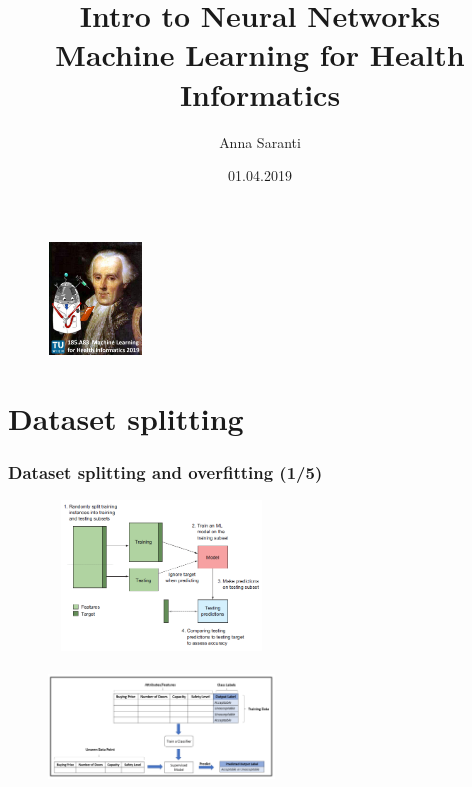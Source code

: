 \documentclass{beamer}
\title[Intro to Neural Networks]{Intro to Neural Networks\\Machine Learning for Health Informatics}
\author{Anna Saranti}
\institute{Holzinger Group hci-kdd.org}
\date{01.04.2019}
\begin{document}
\begin{frame}
  \titlepage
  
  \begin{figure}[ht]
	\centering
    \includegraphics[width=2.5cm, height=3cm]{figures/HddKciLogo}
	\label{fig:HddKciLogo}
  \end{figure}
  
\end{frame}

\section{Dataset splitting} 
\begin{frame}
\frametitle{Dataset splitting and overfitting (1/5)}

\begin{figure}
  \includegraphics[width=6cm, height=4cm]{figures/ML_Workflow.png}
\end{figure}

\begin{figure}
  \includegraphics[width=6cm, height=3cm]{figures/DataSetsExample.png}
\end{figure}

\end{frame}
\end{document}
